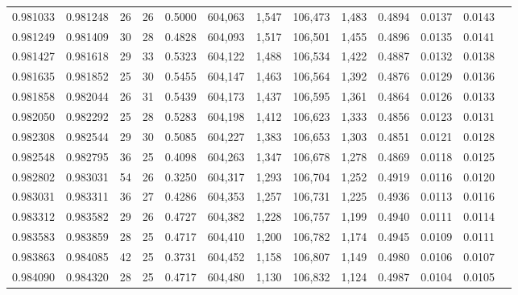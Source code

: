 \begin{tabular}{rrrrrrrrrrrrr}
0.981033 & 0.981248 &    26 &  26 &                                     0.5000 & 604,063 &   1,547 & 106,473 &   1,483 & 0.4894 & 0.0137 & 0.0143 \\
0.981249 & 0.981409 &    30 &  28 &                                     0.4828 & 604,093 &   1,517 & 106,501 &   1,455 & 0.4896 & 0.0135 & 0.0141 \\
0.981427 & 0.981618 &    29 &  33 &                                     0.5323 & 604,122 &   1,488 & 106,534 &   1,422 & 0.4887 & 0.0132 & 0.0138 \\
0.981635 & 0.981852 &    25 &  30 &                                     0.5455 & 604,147 &   1,463 & 106,564 &   1,392 & 0.4876 & 0.0129 & 0.0136 \\
0.981858 & 0.982044 &    26 &  31 &                                     0.5439 & 604,173 &   1,437 & 106,595 &   1,361 & 0.4864 & 0.0126 & 0.0133 \\
0.982050 & 0.982292 &    25 &  28 &                                     0.5283 & 604,198 &   1,412 & 106,623 &   1,333 & 0.4856 & 0.0123 & 0.0131 \\
0.982308 & 0.982544 &    29 &  30 &                                     0.5085 & 604,227 &   1,383 & 106,653 &   1,303 & 0.4851 & 0.0121 & 0.0128 \\
0.982548 & 0.982795 &    36 &  25 &                                     0.4098 & 604,263 &   1,347 & 106,678 &   1,278 & 0.4869 & 0.0118 & 0.0125 \\
0.982802 & 0.983031 &    54 &  26 &                                     0.3250 & 604,317 &   1,293 & 106,704 &   1,252 & 0.4919 & 0.0116 & 0.0120 \\
0.983031 & 0.983311 &    36 &  27 &                                     0.4286 & 604,353 &   1,257 & 106,731 &   1,225 & 0.4936 & 0.0113 & 0.0116 \\
0.983312 & 0.983582 &    29 &  26 &                                     0.4727 & 604,382 &   1,228 & 106,757 &   1,199 & 0.4940 & 0.0111 & 0.0114 \\
0.983583 & 0.983859 &    28 &  25 &                                     0.4717 & 604,410 &   1,200 & 106,782 &   1,174 & 0.4945 & 0.0109 & 0.0111 \\
0.983863 & 0.984085 &    42 &  25 &                                     0.3731 & 604,452 &   1,158 & 106,807 &   1,149 & 0.4980 & 0.0106 & 0.0107 \\
0.984090 & 0.984320 &    28 &  25 &                                     0.4717 & 604,480 &   1,130 & 106,832 &   1,124 & 0.4987 & 0.0104 & 0.0105 \\

\end{tabular}
